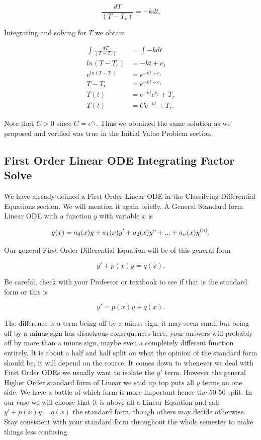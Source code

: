 \documentclass[12pt]{article}
\begin{document}
\begin{equation*}
    \frac{dT}{(T-T_r)}=-kdt.
\end{equation*}

Integrating and solving for $T$ we obtain

\begin{align*}
    \int \frac{dT}{(T-T_r)}&=\int -kdt \\
    ln(T-T_r)&=-kt+c_1 \\
    e^{ln(T-T_r)}&=e^{-kt+c_1} \\
    T-T_r&=e^{-kt+c_1} \\
    T(t)&=e^{-kt}e^{c_1}+T_r \\
    T(t)&=Ce^{-kt}+T_r.
\end{align*}

Note that $C>0$ since $C=e^{c_1}$. Thus we obtained the same solution as we proposed and verified was true in the Initial Value Problem section.

\subsection{First Order Linear ODE Integrating Factor Solve}

We have already defined a First Order Linear ODE in the Classifying Differential Equations section. We will mention it again briefly. A General Standard form Linear ODE with a function $y$ with variable $x$ is

\begin{equation*}
    g(x) = a_0(x)y+a_1(x)y'+a_2(x)y"+...+a_n(x)y^{(n)}.
\end{equation*}

Our general First Order Differential Equation will be of this general form

\begin{equation*}
    y'+p(x)y=q(x).
\end{equation*}

Be careful, check with your Professor or textbook to see if that is the standard form or this is

\begin{equation*}
    y'=p(x)y+q(x).
\end{equation*}

The difference is a term being off by a minus sign, it may seem small but being off by a minus sign has disastrous consequences here, your answers will probably off by more than a minus sign, maybe even a completely different function entirely. It is about a half and half split on what the opinion of the standard form should be, it will depend on the source. It comes down to whenever we deal with First Order ODEs we usually want to isolate the $y'$ term. However the general Higher Order standard form of Linear we said up top puts all $y$ terms on one side. We have a battle of which form is more important hence the 50-50 split. In our case we will choose that it is above all a Linear Equation and call $y'+p(x)y=q(x)$ the standard form, though others may decide otherwise. Stay consistent with your standard form throughout the whole semester to make things less confusing. \\
\end{document}
